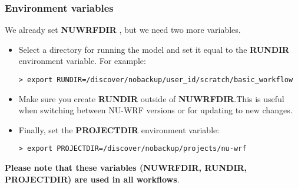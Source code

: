 \begin{frame}[fragile]\frametitle{Environment variables}

We already set \textbf{NUWRFDIR} , but we need two more variables.
\begin{itemize}
\item Select a directory for running the model and set it equal to the \textbf{RUNDIR} environment variable. For example:
\begin{lstlisting}
> export RUNDIR=/discover/nobackup/user_id/scratch/basic_workflow
\end{lstlisting}
\item Make sure you create \textbf{RUNDIR} outside of \textbf{NUWRFDIR}.This is useful when switching between NU-WRF versions or for updating to new changes.
\item Finally, set the \textbf{PROJECTDIR} environment variable:
\begin{lstlisting}
> export PROJECTDIR=/discover/nobackup/projects/nu-wrf
\end{lstlisting}
\end{itemize}
\footnotesize{\textbf{Please note that these variables (NUWRFDIR, RUNDIR, PROJECTDIR) are used in all workflows}.}

\end{frame}

